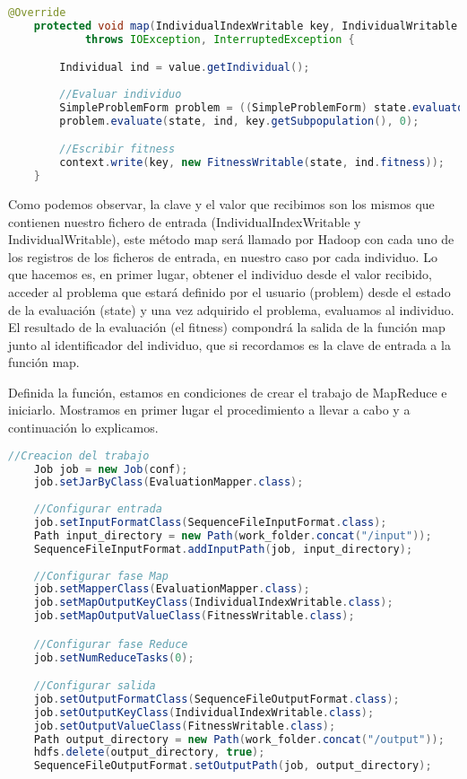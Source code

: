 \begin{lstlisting}[language=Java]
	@Override
	protected void map(IndividualIndexWritable key, IndividualWritable value, Context context)
			throws IOException, InterruptedException {

		Individual ind = value.getIndividual();
		
		//Evaluar individuo
		SimpleProblemForm problem = ((SimpleProblemForm) state.evaluator.p_problem);
		problem.evaluate(state, ind, key.getSubpopulation(), 0);

		//Escribir fitness
		context.write(key, new FitnessWritable(state, ind.fitness));
	}
\end{lstlisting}

Como podemos observar, la clave y el valor que recibimos son los mismos que contienen nuestro fichero de entrada (IndividualIndexWritable y IndividualWritable), este método map ser\'a llamado por Hadoop con cada uno de los registros de los ficheros de entrada, en nuestro caso por cada individuo. Lo que hacemos es, en primer lugar, obtener el individuo desde el valor recibido, acceder al problema que estará definido por el usuario (problem) desde el estado de la evaluación (state) y una vez adquirido el problema, evaluamos al individuo. El resultado de la evaluación (el fitness) compondrá la salida de la función map junto al identificador del individuo, que si recordamos es la clave de entrada a la función map.

Definida la función, estamos en condiciones de crear el trabajo de MapReduce e iniciarlo. Mostramos en primer lugar el procedimiento a llevar a cabo y a continuación lo explicamos.

\begin{lstlisting}[language=Java]
	//Creacion del trabajo
	Job job = new Job(conf);
	job.setJarByClass(EvaluationMapper.class);
	
	//Configurar entrada
	job.setInputFormatClass(SequenceFileInputFormat.class);
	Path input_directory = new Path(work_folder.concat("/input"));
	SequenceFileInputFormat.addInputPath(job, input_directory);
	
	//Configurar fase Map
	job.setMapperClass(EvaluationMapper.class);
	job.setMapOutputKeyClass(IndividualIndexWritable.class);
	job.setMapOutputValueClass(FitnessWritable.class);

	//Configurar fase Reduce
	job.setNumReduceTasks(0);

	//Configurar salida
	job.setOutputFormatClass(SequenceFileOutputFormat.class);
	job.setOutputKeyClass(IndividualIndexWritable.class);
	job.setOutputValueClass(FitnessWritable.class);
	Path output_directory = new Path(work_folder.concat("/output"));
	hdfs.delete(output_directory, true);
	SequenceFileOutputFormat.setOutputPath(job, output_directory);
\end{lstlisting}


